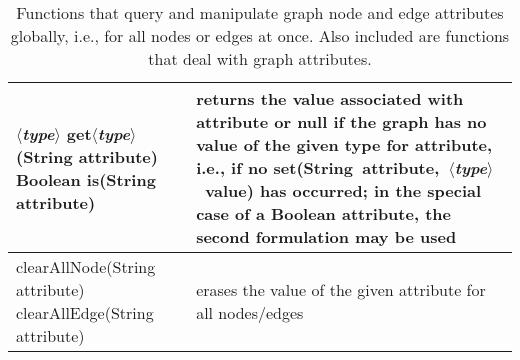 \begin{table}
\begin{tabular}{| m{} | m{} |}
    \\ \hline
    \shortstack[l]{
    \textsf{$\langle$\emph{type}$\rangle$ get$\langle$\emph{type}$\rangle$(String attribute)}\\
    \textsf{Boolean is(String attribute)}
    }
    &
    returns the value associated with \textsf{attribute} or \textsf{null}
    if the graph has no value of the given type for \textsf{attribute}, i.e.,
    if no
    \textsf{set(String~attribute,~$\langle$\emph{type}$\rangle$~value)} has occurred;
    in the special case of a \textsf{Boolean} attribute, the second formulation
    may be used
    \\ \hline
    \shortstack[l]{
      \textsf{clearAllNode(String attribute)}\\
      \textsf{clearAllEdge(String attribute)}
    }
    &
    erases the value of the given attribute for all nodes/edges
    \\ \hline
  \end{tabular}

  \caption{Functions that query and manipulate graph
    node and edge attributes globally, i.e., for all nodes or edges
    at once. Also included are functions that deal with graph attributes.}
  \label{tab:graph_attribute_functions}
\end{table}
